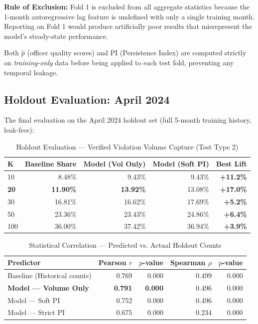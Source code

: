 \documentclass[12pt,a4paper]{article}
\begin{document}
\textbf{Rule of Exclusion:} Fold 1 is excluded from all aggregate statistics because the 1-month autoregressive lag feature is undefined with only a single training month. Reporting on Fold 1 would produce artificially poor results that misrepresent the model's steady-state performance.

Both $\hat{p}$ (officer quality scores) and PI (Persistence Index) are computed strictly on \textit{training-only} data before being applied to each test fold, preventing any temporal leakage.

\subsection{Holdout Evaluation: April 2024}

The final evaluation on the April 2024 holdout set (full 5-month training history, leak-free):

\begin{table}[H]
\centering
\caption{Holdout Evaluation — Verified Violation Volume Capture (Test Type 2)}
\begin{tabular}{lrrrr}
\toprule
\textbf{K} & \textbf{Baseline Share} & \textbf{Model (Vol Only)} & \textbf{Model (Soft PI)} & \textbf{Best Lift} \\
\midrule
10 & 8.48\% & 9.43\% & 9.43\% & \textbf{+11.2\%} \\
\rowcolor{emerald!12} \textbf{20} & \textbf{11.90\%} & \textbf{13.92\%} & 13.08\% & \textbf{+17.0\%} \\
30 & 16.81\% & 16.62\% & 17.69\% & \textbf{+5.2\%} \\
50 & 23.36\% & 23.43\% & 24.86\% & \textbf{+6.4\%} \\
100 & 36.00\% & 37.42\% & 36.94\% & \textbf{+3.9\%} \\
\bottomrule
\end{tabular}
\end{table}

\begin{table}[H]
\centering
\caption{Statistical Correlation — Predicted vs. Actual Holdout Counts}
\begin{tabular}{lrrrr}
\toprule
\textbf{Predictor} & \textbf{Pearson $r$} & \textbf{$p$-value} & \textbf{Spearman $\rho$} & \textbf{$p$-value} \\
\midrule
Baseline (Historical counts) & 0.769 & 0.000 & 0.499 & 0.000 \\
\rowcolor{emerald!12} \textbf{Model — Volume Only} & \textbf{0.791} & \textbf{0.000} & 0.496 & 0.000 \\
Model — Soft PI & 0.752 & 0.000 & 0.496 & 0.000 \\
Model — Strict PI & 0.675 & 0.000 & 0.234 & 0.000 \\
\bottomrule
\end{tabular}
\end{table}
\end{document}
